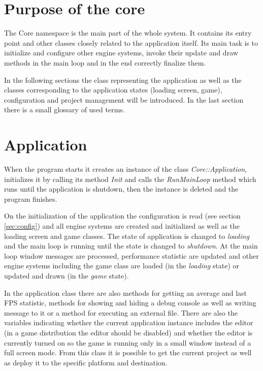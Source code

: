 \documentclass[a4paper, 12pt]{report}
\begin{document}
\section{Purpose of the core}

The Core namespace is the main part of the whole system. It contains its entry point and other classes closely related to the application itself. Its main task is to initialize and configure other engine systems, invoke their update and draw methods in the main loop and in the end correctly finalize them.

In the following sections the class representing the application as well as the classes corresponding to the application states (loading screen, game), configuration and project management will be introduced. In the last section there is a small glossary of used terms.

\section{Application}

When the program starts it creates an instance of the class \emph{Core::Application}, initializes it by calling its method \emph{Init} and calls the \emph{RunMainLoop} method which runs until the application is shutdown, then the instance is deleted and the program finishes.

On the initialization of the application the configuration is read (see section \ref{sec:config}) and all engine systems are created and initialized as well as the loading screen and game classes. The state of application is changed to \emph{loading} and the main loop is running until the state is changed to \emph{shutdown}. At the main loop window messages are processed, performance statistic are updated and other engine systems including the game class are loaded (in the \emph{loading} state) or updated and drawn (in the \emph{game} state).

In the application class there are also methods for getting an average and last FPS statistic, methods for showing and hiding a debug console as well as writing message to it or a method for executing an external file. There are also the variables indicating whether the current application instance includes the editor (in a game distribution the editor should be disabled) and whether the editor is currently turned on so the game is running only in a small window instead of a full screen mode. From this class it is possible to get the current project as well as deploy it to the specific platform and destination.
\end{document}
